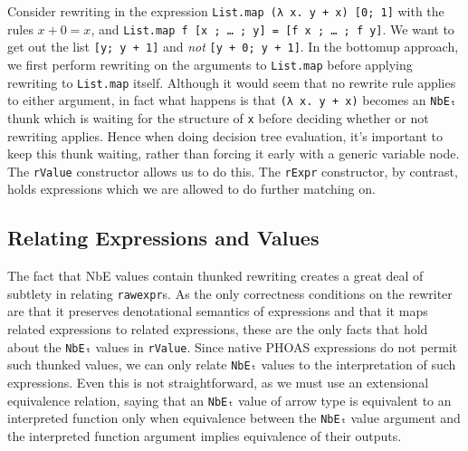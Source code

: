 Consider rewriting in the expression \texttt{List.map (λ x. y + x) [0; 1]} with the rules $x + 0 = x$, and \texttt{List.map f [x ; … ; y] = [f x ; … ; f y]}.
We want to get out the list \texttt{[y; y + 1]} and \emph{not} \texttt{[y + 0; y + 1]}.
In the bottomup approach, we first perform rewriting on the arguments to \texttt{List.map} before applying rewriting to \texttt{List.map} itself.
Although it would seem that no rewrite rule applies to either argument, in fact what happens is that \texttt{(λ x. y + x)} becomes an \texttt{NbEₜ} thunk which is waiting for the structure of \texttt{x} before deciding whether or not rewriting applies.
Hence when doing decision tree evaluation, it's important to keep this thunk waiting, rather than forcing it early with a generic variable node.
The \texttt{rValue} constructor allows us to do this.
The \texttt{rExpr} constructor, by contrast, holds expressions which we are allowed to do further matching on.

\subsection{Relating Expressions and Values}\label{sec:rewriting-more:values-and-expressions}
The fact that NbE values contain thunked rewriting creates a great deal of subtlety in relating \texttt{rawexpr}s.
As the only correctness conditions on the rewriter are that it preserves denotational semantics of expressions and that it maps related expressions to related expressions, these are the only facts that hold about the \texttt{NbEₜ} values in \texttt{rValue}.
Since native PHOAS expressions do not permit such thunked values, we can only relate \texttt{NbEₜ} values to the interpretation of such expressions.
Even this is not straightforward, as we must use an extensional equivalence relation, saying that an \texttt{NbEₜ} value of arrow type is equivalent to an interpreted function only when equivalence between the \texttt{NbEₜ} value argument and the interpreted function argument implies equivalence of their outputs.

